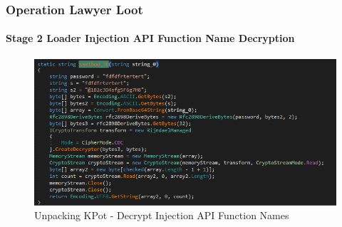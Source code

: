\documentclass[aspectratio=169]{beamer}
\begin{document}
{
\begin{frame}
  \frametitle{Operation Lawyer Loot}
  \framesubtitle{Stage 2 Loader Injection API Function Name Decryption}
  \begin{center}
    \begin{figure}
      \includegraphics[width=12cm]{kpot-unpacking-9}
      \caption{Unpacking KPot - Decrypt Injection API Function Names}
    \end{figure}
  \end{center}
\end{frame}
}
\end{document}
